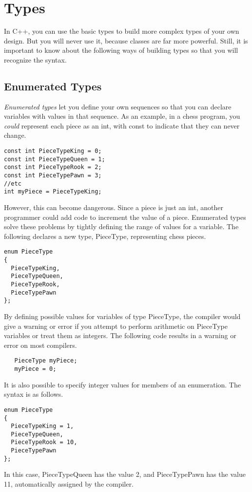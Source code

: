 \documentclass{article}
\begin{document}
\section{Types}
In C++, you can use the basic types to build more complex types of your own design. But you will never
use it, because classes are far more powerful. Still, it is important to know about the following
ways of building types so that you will recognize the syntax.
\subsection{Enumerated Types}
\textit{Enumerated types} let you define your own sequences so that you can declare variables with values
in that sequence. As an example, in a chess program, you \textit{could} represent each piece as an int,
with const to indicate that they can never change.
\begin{verbatim}
const int PieceTypeKing = 0;
const int PieceTypeQueen = 1;
const int PieceTypeRook = 2;
const int PieceTypePawn = 3;
//etc
int myPiece = PieceTypeKing; 
\end{verbatim}
However, this can become dangerous. Since a piece is just an int, another programmer could add code
to increment the value of a piece. Enumerated types solve these problems by tightly defining the range
of values for a variable. The following declares a new type, PieceType, representing chess pieces.
\begin{verbatim}
enum PieceType 
{
  PieceTypeKing,
  PieceTypeQueen,
  PieceTypeRook,
  PieceTypePawn
};
\end{verbatim}
By defining possible values for variables of type PieceType, the compiler would give a warning or error
if you attempt to perform arithmetic on PieceType variables or treat them as integers. The following
code results in a warning or error on most compilers.
\begin{verbatim}
   PieceType myPiece;
   myPiece = 0;
\end{verbatim}
It is also possible to specify integer values for members of an enumeration. The syntax is as follows.
\begin{verbatim}
enum PieceType
{
  PieceTypeKing = 1,
  PieceTypeQueen,
  PieceTypeRook = 10,
  PieceTypePawn
};
\end{verbatim}
In this case, PieceTypeQueen has the value 2, and PieceTypePawn has the value 11, automatically assigned
by the compiler.
\end{document}
